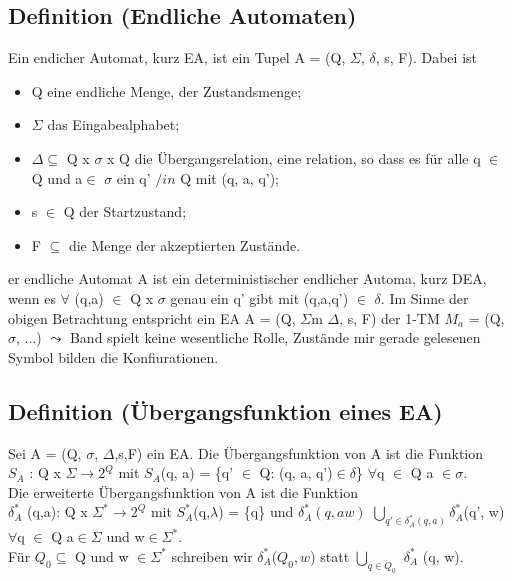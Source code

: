 \documentclass[a4paper,11pt]{article}
\begin{document}
\subsection{Definition (Endliche Automaten)}
Ein endicher Automat, kurz EA, ist ein Tupel A = (Q, $\Sigma$, $\delta$, s, F). Dabei ist 
\begin{itemize}
    \item Q eine endliche Menge, der Zustandsmenge;
    \item $\Sigma$ das Eingabealphabet;
    \item $\Delta \subseteq$ Q x $\sigma$ x Q die Übergangsrelation, eine relation, so dass es für alle q $\in$ Q und a$\in$ $\sigma$ ein q' $/in$ Q mit (q, a, q');
    \item s $\in$ Q der Startzustand;
    \item F $\subseteq$ die Menge der akzeptierten Zustände.
\end{itemize}
er endliche Automat A ist ein deterministischer endlicher Automa,
kurz DEA, wenn es $\forall$ (q,a) $\in$ Q x $\sigma$ genau ein q' gibt mit (q,a,q') $\in$ $\delta$. 
Im Sinne der obigen Betrachtung entspricht ein EA A = (Q, $\Sigma$m $\Delta$, s, F) der 1-TM $M_{a}$ = (Q, $\sigma$, ...)
$\leadsto $ Band spielt keine wesentliche Rolle, Zustände mir gerade gelesenen Symbol bilden die Konfiurationen.

\subsection{Definition (Übergangsfunktion eines EA)}
Sei A = (Q, $\sigma$, $\Delta$,s,F) ein EA. 
Die Übergangsfunktion von A ist die Funktion \\
$S_{A}$ : Q x $\Sigma \to 2^{Q}$ mit $S_{A}$(q, a) = \{q' $\in$ Q: (q, a, q')$\in \delta$\} $\forall$q $\in$ Q a $\in \sigma$.\\
Die erweiterte Übergangsfunktion von A ist die Funktion \\
$\delta_{A}^{*}$ (q,a): Q x $\Sigma^{*} \to 2^{Q}$ mit $S_{A}^{*}$(q,$\lambda$) = \{q\} und $\delta_{A}^{*}(q, aw)$ $\underset{q' \in \delta_{A}^{*}(q,a)}{\bigcup} \delta_{A}^{*}$(q', w) $\forall$q $\in$ Q a$\in \Sigma$ und w$\in \Sigma^{*}$.\\
Für $Q_{0} \subseteq $ Q und w $\in \Sigma^{*}$ schreiben wir $\delta_{A}^{*} $($Q_{0}, w$) statt $\underset{q \in Q_{0}}{\bigcup}$ $\delta_{A}^{*}$ (q, w).
\end{document}
